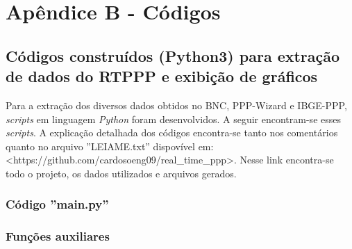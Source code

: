 %
%
% 
%


\chapter{Apêndice B - Códigos}
\noindent

\section{Códigos construídos (Python3) para extração de dados do RTPPP e exibição de gráficos}

Para a extração dos diversos dados obtidos no BNC, PPP-Wizard e IBGE-PPP, \textit{scripts} em linguagem \textit{Python} foram desenvolvidos. A seguir encontram-se esses \textit{scripts}. A explicação detalhada dos códigos encontra-se tanto nos comentários quanto no arquivo ''LEIAME.txt'' dispovível em: <https://github.com/cardosoeng09/real\_time\_ppp>. Nesse link encontra-se todo o projeto, os dados utilizados e arquivos gerados.

\subsection{Código ''main.py''}



\subsection{Funções auxiliares}



